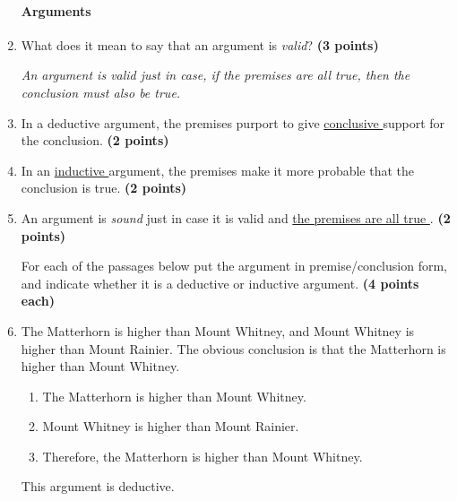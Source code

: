\documentclass[10pt]{article}
\begin{document}
\begin{enumerate}

\paragraph{Arguments}

  \item What does it mean to say that an argument is \textit{valid}? \textbf{(3 points)}
  
  \vspace{2mm}
  \textit{An argument is valid just in case, if the premises are all true, then the conclusion must also be true.}
  \vspace{2mm}
  
  \item In a deductive argument, the premises purport to give \underline{  conclusive  } support for the conclusion. \textbf{(2 points)}
  
  \item In an \underline{  inductive  } argument, the premises make it more probable that the conclusion is true. \textbf{(2 points)}
  
  \item An argument is \textit{sound} just in case it is valid and \underline{  the premises are all true  }. \textbf{(2 points)}
  

\vspace{0.5cm}

For each of the passages below put the argument in premise/conclusion form, and indicate whether it is a deductive or inductive argument. \textbf{(4 points each)}


  \item The Matterhorn is higher than Mount Whitney, and Mount Whitney is higher than Mount Rainier. The obvious conclusion is that the Matterhorn is higher than Mount Whitney.
  
  \vspace{2mm}
  \begin{enumerate}[1)]
   \item The Matterhorn is higher than Mount Whitney.
   \item Mount Whitney is higher than Mount Rainier.
   \item Therefore, the Matterhorn is higher than Mount Whitney.
  \end{enumerate}
  This argument is deductive.
  \vspace{2mm}
  

\end{enumerate}
\end{document}
